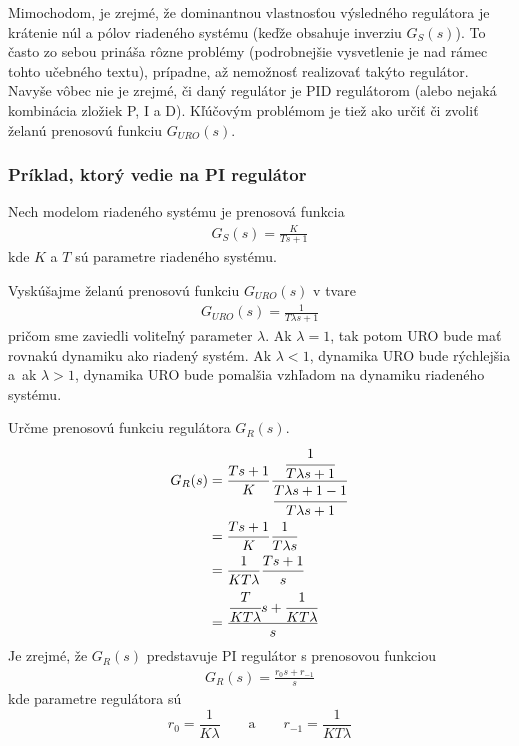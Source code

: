 \documentclass[a4paper, 10pt, ]{article}
\begin{document}
Mimochodom, je zrejmé, že dominantnou vlastnosťou výsledného regulátora je krátenie núl a pólov riadeného systému (keďže obsahuje inverziu $G_S(s)$). To často zo sebou prináša rôzne problémy (podrobnejšie vysvetlenie je nad rámec tohto učebného textu), prípadne, až nemožnosť realizovať takýto regulátor. Navyše vôbec nie je zrejmé, či daný regulátor je PID regulátorom (alebo nejaká kombinácia zložiek P, I a D). Kľúčovým problémom je tiež ako určiť či zvoliť želanú prenosovú funkciu $G_{URO}(s)$.











\subsubsection{Príklad, ktorý vedie na PI regulátor}


Nech modelom riadeného systému je prenosová funkcia
\begin{align}
    G_S(s) = \frac{K}{Ts+1}
\end{align}
kde $K$ a $T$ sú parametre riadeného systému.

Vyskúšajme želanú prenosovú funkciu $G_{URO}(s)$ v tvare
\begin{align}
    G_{URO}(s) = \frac{1}{T \lambda s + 1}
\end{align}
pričom sme zaviedli voliteľný parameter $\lambda$. Ak $\lambda = 1$, tak potom URO bude mať rovnakú dynamiku ako riadený systém. Ak $\lambda < 1$, dynamika URO bude rýchlejšia a~ak $\lambda > 1$, dynamika URO bude pomalšia vzhľadom na dynamiku riadeného systému.

Určme prenosovú funkciu regulátora $G_R(s)$.
\begin{equation} 
    \begin{aligned}
        G_R(s)  &= \frac{Ts+1}{K} \frac{ \cfrac{1}{T \lambda s + 1}   }{  \cfrac{T \lambda s + 1 - 1}{T \lambda s + 1}  }  \\
        &=   \frac{Ts+1}{K} \frac{1}{T \lambda s} \\
        &= \frac{1}{K T \lambda} \frac{Ts+1}{s} \\
        &= \frac{  \cfrac{T}{K T \lambda} s + \cfrac{1}{K T \lambda}  }{ s }
    \end{aligned}
\end{equation}
Je zrejmé, že $G_R(s)$ predstavuje PI regulátor s prenosovou funkciou
\begin{align}
    G_R(s) = \frac{r_0 s + r_{-1}}{s}
\end{align}
kde parametre regulátora sú
\begin{equation} \label{r0r1analyt}
    r_0 = \frac{1}{K \lambda} \qquad \text{a} \qquad r_{-1} = \frac{1}{K T \lambda}
\end{equation}
\end{document}
